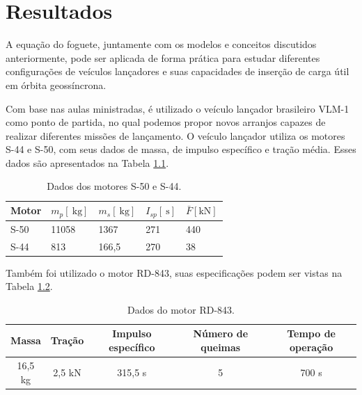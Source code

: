 \chapter{Resultados}

A equação do foguete, juntamente com os modelos e conceitos discutidos anteriormente, pode ser aplicada de forma prática para estudar diferentes configurações de veículos lançadores e suas capacidades de inserção de carga útil em órbita geossíncrona.

Com base nas aulas ministradas, é utilizado o veículo lançador brasileiro VLM-1 como ponto de partida, no qual podemos propor novos arranjos capazes de realizar diferentes missões de lançamento. O veículo lançador utiliza os motores S-44 e S-50, com seus dados de massa, de impulso específico e tração média. Esses dados são apresentados na Tabela \ref{tab:daods}.


\begin{table}[H]
\centering
\caption{Dados dos motores S-50 e S-44.} %
\label{tab:daods}
\begin{tabular}{@{}lllll@{}}
\toprule
Motor & $m_{p}[\mathrm{~kg}]$ & $m_{s}[\mathrm{~kg}]$ & $I_{s p}[\mathrm{~s}]$ & $\bar{F}[\mathrm{kN}]$ \\ \midrule
S-50  & 11058                 & 1367                  & 271                    & 440                    \\ 
S-44  & 813                   & 166,5                 & 270                    & 38                     \\ \bottomrule
\end{tabular}
\end{table}

Também foi utilizado o motor RD-843, suas especificações podem ser vistas na Tabela \ref{tab:rdd}.

\begin{table}[H]
\centering
\caption{Dados do motor RD-843.} %
\label{tab:rdd}
\begin{tabular}{@{}ccccc@{}}
\toprule
Massa               & Tração             & Impulso específico & Número de queimas & Tempo de operação \\ \midrule
16,5 kg             & 2,5 kN             & 315,5 s            & 5                  & 700 s             \\ \bottomrule
\end{tabular}
\end{table}

